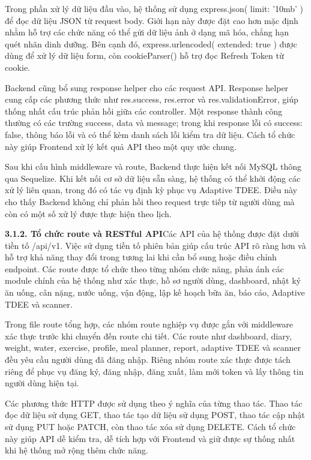 Trong phần xử lý dữ liệu đầu vào, hệ thống sử dụng express.json({ limit: '10mb' }) để đọc dữ liệu JSON từ request body. Giới hạn này được đặt cao hơn mặc định nhằm hỗ trợ các chức năng có thể gửi dữ liệu ảnh ở dạng mã hóa, chẳng hạn quét nhãn dinh dưỡng. Bên cạnh đó, express.urlencoded({ extended: true }) được dùng để xử lý dữ liệu form, còn cookieParser() hỗ trợ đọc Refresh Token từ cookie.

Backend cũng bổ sung response helper cho các request API. Response helper cung cấp các phương thức như res.success, res.error và res.validationError, giúp thống nhất cấu trúc phản hồi giữa các controller. Một response thành công thường có các trường success, data và message; trong khi response lỗi có success: false, thông báo lỗi và có thể kèm danh sách lỗi kiểm tra dữ liệu. Cách tổ chức này giúp Frontend xử lý kết quả API theo một quy ước chung.

Sau khi cấu hình middleware và route, Backend thực hiện kết nối MySQL thông qua Sequelize. Khi kết nối cơ sở dữ liệu sẵn sàng, hệ thống có thể khởi động các xử lý liên quan, trong đó có tác vụ định kỳ phục vụ Adaptive TDEE. Điều này cho thấy Backend không chỉ phản hồi theo request trực tiếp từ người dùng mà còn có một số xử lý được thực hiện theo lịch.

\textbf{3.1.2. Tổ chức route và RESTful API}Các API của hệ thống được đặt dưới tiền tố /api/v1. Việc sử dụng tiền tố phiên bản giúp cấu trúc API rõ ràng hơn và hỗ trợ khả năng thay đổi trong tương lai khi cần bổ sung hoặc điều chỉnh endpoint. Các route được tổ chức theo từng nhóm chức năng, phản ánh các module chính của hệ thống như xác thực, hồ sơ người dùng, dashboard, nhật ký ăn uống, cân nặng, nước uống, vận động, lập kế hoạch bữa ăn, báo cáo, Adaptive TDEE và scanner.

Trong file route tổng hợp, các nhóm route nghiệp vụ được gắn với middleware xác thực trước khi chuyển đến route chi tiết. Các route như dashboard, diary, weight, water, exercise, profile, meal planner, report, adaptive TDEE và scanner đều yêu cầu người dùng đã đăng nhập. Riêng nhóm route xác thực được tách riêng để phục vụ đăng ký, đăng nhập, đăng xuất, làm mới token và lấy thông tin người dùng hiện tại.

Các phương thức HTTP được sử dụng theo ý nghĩa của từng thao tác. Thao tác đọc dữ liệu sử dụng GET, thao tác tạo dữ liệu sử dụng POST, thao tác cập nhật sử dụng PUT hoặc PATCH, còn thao tác xóa sử dụng DELETE. Cách tổ chức này giúp API dễ kiểm tra, dễ tích hợp với Frontend và giữ được sự thống nhất khi hệ thống mở rộng thêm chức năng.

